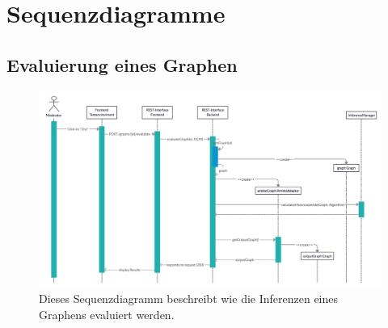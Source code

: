 \documentclass{article}
\begin{document}
\section{Sequenzdiagramme}

\subsection{Evaluierung eines Graphen}
\begin{figure}[ht!]
    \includegraphics[width=\textwidth,height=\textheight,keepaspectratio]{image/SequenceEvaluateGraph.png}
    \caption{Dieses Sequenzdiagramm beschreibt wie die Inferenzen eines Graphens evaluiert werden.}
\end{figure}
\end{document}
